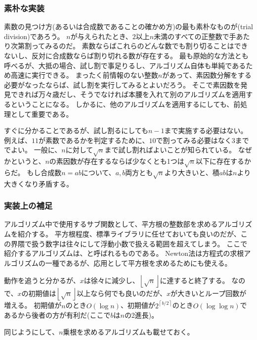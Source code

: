\subsubsection{素朴な実装}
素数の見つけ方(あるいは合成数であることの確かめ方)の最も素朴なものが(trial division)であろう。
$n$が与えられたとき、$2$以上$n$未満のすべての正整数で手あたり次第割ってみるのだ。
素数ならばこれらのどんな数でも割り切ることはできないし、反対に合成数ならば割り切れる数が存在する。
最も原始的な方法とも呼べるが、大抵の場合、試し割で事足りるし、アルゴリズム自体も単純であるため高速に実行できる。
まったく前情報のない整数$n$があって、素因数分解をする必要がなったならば、試し割を実行してみるとよいだろう。
そこで素因数を発見できれば万々歳だし、そうでなければ本腰を入れて別のアルゴリズムを適用するということになる。
しかるに、他のアルゴリズムを適用するにしても、前処理として重要である。

すぐに分かることであるが、試し割るにしても$n-1$まで実施する必要はない。
例えば、$11$が素数であるかを判定するために、$10$で割ってみる必要はなく$3$まででよい。
一般に、$n$に対して$\sqrt{n}$まで試し割ればよいことが知られている。
なぜかというと、$n$の素因数が存在するならば少なくとも1つは$\sqrt{n}$以下に存在するからだ。
もし合成数$n=ab$について、$a,b$両方とも$\sqrt{n}$より大きいと、積$ab$は$n$より大きくなり矛盾する。


\subsubsection{実装上の補足}
アルゴリズム中で使用するサブ関数として、平方根の整数部を求めるアルゴリズムを紹介する。
平方根程度、標準ライブラリに任せておいても良いのだが、この界隈で扱う数字は往々にして浮動小数で扱える範囲を超えてしまう。
ここで紹介するアルゴリズムは、と呼ばれるものである。
Newton法は方程式の求根アルゴリズムの一種であるが、応用として平方根を求めるためにも使える。

動作を追うと分かるが、$x$は徐々に減少し、$\left \lfloor\sqrt{n}\right \rfloor$に達すると終了する。
なので、$x$の初期値は$\left \lfloor\sqrt{n}\right \rfloor$以上なら何でも良いのだが、$x$が大きいとループ回数が増える。
初期値が$n$のとき$O(\log{n})$、初期値が$2^{\left \lceil b/2 \right \rceil}$のとき$O(\log\log{n})$であるから後者の方が有利だ(ここで$b$は$n$の2進長)。


同じようにして、$n$乗根を求めるアルゴリズムも載せておく。


